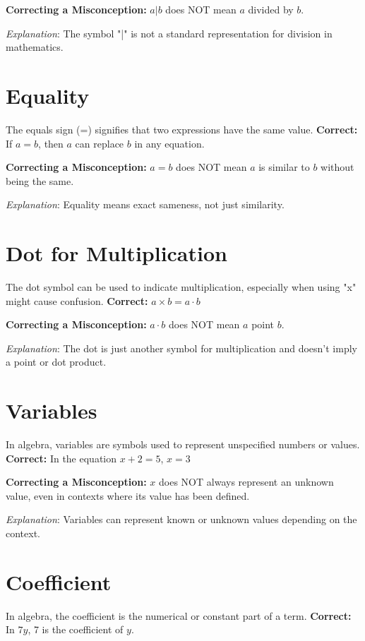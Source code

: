 \documentclass[12pt]{article}
\begin{document}
\textbf{Correcting a Misconception:} \(a|b\) does NOT mean \(a\) divided by \(b\).

\textit{Explanation}: The symbol "|" is not a standard representation for division in mathematics.

\section*{Equality}
The equals sign (=) signifies that two expressions have the same value.
\textbf{Correct:} If \(a = b\), then \(a\) can replace \(b\) in any equation.

\textbf{Correcting a Misconception:} \(a = b\) does NOT mean \(a\) is similar to \(b\) without being the same.

\textit{Explanation}: Equality means exact sameness, not just similarity.

\section*{Dot for Multiplication}
The dot symbol can be used to indicate multiplication, especially when using "x" might cause confusion.
\textbf{Correct:} \(a \times b = a \cdot b\)

\textbf{Correcting a Misconception:} \(a \cdot b\) does NOT mean \(a\) point \(b\).

\textit{Explanation}: The dot is just another symbol for multiplication and doesn't imply a point or dot product.

\section*{Variables}
In algebra, variables are symbols used to represent unspecified numbers or values.
\textbf{Correct:} In the equation \(x + 2 = 5\), \(x = 3\)

\textbf{Correcting a Misconception:} \(x\) does NOT always represent an unknown value, even in contexts where its value has been defined.

\textit{Explanation}: Variables can represent known or unknown values depending on the context.

\section*{Coefficient}
In algebra, the coefficient is the numerical or constant part of a term.
\textbf{Correct:} In \(7y\), 7 is the coefficient of \(y\).
\end{document}
